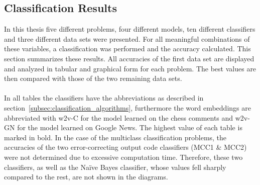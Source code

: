 \documentclass[article,type=msc,colorback,accentcolor=tud7b]{tudthesis}
\begin{document}
  \subsection{Classification Results}
    In this thesis five different problems, four different models, ten different classifiers and three different data sets were presented. For all meaningful combinations of these variables, a classification was performed and the accuracy calculated. This section summarizes these results. All accuracies of the first data set are displayed and analyzed in tabular and graphical form for each problem. The best values are then compared with those of the two remaining data sets. \\\\
    In all tables the classifiers have the abbreviations as described in section~\ref{subsec:classification_algorithms}, furthermore the word embeddings are abbreviated with w2v-C for the model learned on the chess comments and w2v-GN for the model learned on Google News. The highest value of each table is marked in bold. In the case of the multiclass classification problems, the accuracies of the two error-correcting output code classifiers (MCC1 \& MCC2) were not determined due to excessive computation time. Therefore, these two classifiers, as well as the Naïve Bayes classifier, whose values fell sharply compared to the rest, are not shown in the diagrams.
\end{document}
